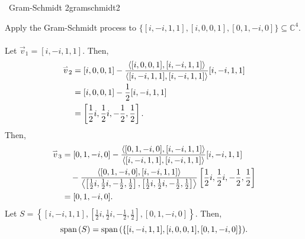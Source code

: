         \pagebreak
        \begin{example}{\Difficulty\,\Difficulty\,\,Gram-Schmidt 2}{gramschmidt2}

            Apply the Gram-Schmidt process to \(\{[i,-i,1,1],[i,0,0,1],[0,1,-i,0]\}\subseteq\mathbb{C}^4\).
            \\
            \\
            Let \(\vec{v}_1=[i,-i,1,1]\). Then,
            \begin{align*}
                \overset{_{\rightharpoonup}}{v}_2&=[i,0,0,1]-\frac{\left\langle [i,0,0,1],[i,-i,1,1]\right\rangle}{\left\langle [i,-i,1,1],[i,-i,1,1]\right\rangle}[i,-i,1,1] \\
                &=[i,0,0,1]-\frac{1}{2}[i,-i,1,1] \\
                &=\left[\frac{1}{2}i,\frac{1}{2}i,-\frac{1}{2},\frac{1}{2}\right].
            \end{align*}
            Then,
            \begin{align*}
                \overset{_{\rightharpoonup}}{v}_3&=[0,1,-i,0]-\frac{\left\langle [0,1,-i,0],[i,-i,1,1]\right\rangle}{\left\langle [i,-i,1,1],[i,-i,1,1]\right\rangle}[i,-i,1,1]\\&\quad-\frac{\left\langle [0,1,-i,0],[i,-i,1,1]\right\rangle}{\left\langle \left[\frac{1}{2}i,\frac{1}{2}i,-\frac{1}{2},\frac{1}{2}\right],\left[\frac{1}{2}i,\frac{1}{2}i,-\frac{1}{2},\frac{1}{2}\right]\right\rangle}\left[\frac{1}{2}i,\frac{1}{2}i,-\frac{1}{2},\frac{1}{2}\right] \\
                &=[0,1,-i,0].
            \end{align*}
            Let \(S=\left\{[i,-i,1,1],\left[\frac{1}{2}i,\frac{1}{2}i,-\frac{1}{2},\frac{1}{2}\right],[0,1,-i,0]\right\}\). Then, 
            \begin{equation*}
                \text{span\,}(S)=\text{span\,}(\{[i,-i,1,1],[i,0,0,1],[0,1,-i,0]\}).
            \end{equation*}

        \end{example}
        \pagebreak
